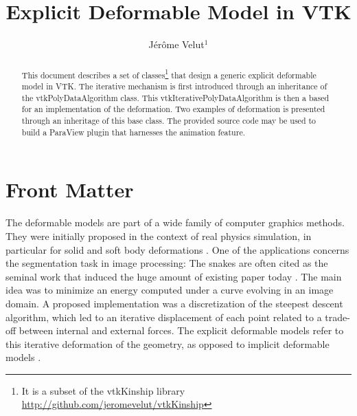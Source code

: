 \documentclass{InsightArticle}
\title{Explicit Deformable Model in VTK}
\author{J\'er\^ome Velut$^{1}$}
\newcommand{\IJhandlerIDnumber}{Xxxx}
\begin{document}
%
% 
\IJhandlefooter{\IJhandlerIDnumber}


\ifpdf
\else
\fi


\maketitle


\ifhtml
\chapter*{Front Matter\label{front}}
\fi


\begin{abstract}
\noindent
This document describes a set of classes\footnote{It is a subset of the
vtkKinship library \url{http://github.com/jeromevelut/vtkKinship}} that 
design a generic explicit deformable model in VTK. The iterative mechanism
is first introduced through an inheritance of the vtkPolyDataAlgorithm class. 
This vtkIterativePolyDataAlgorithm is then a based for an implementation of the
deformation. Two examples of deformation is presented through an inheritage of
this base class. The provided source code may be used to build a ParaView plugin
that harnesses the animation feature.
\end{abstract}

\IJhandlenote{\IJhandlerIDnumber}

\tableofcontents

The deformable models are part of a wide family of computer graphics methods.
They were initially proposed in the context of real physics simulation, 
in particular for solid and soft body deformations \cite{TER87,TER88.3}. One of the
applications concerns the segmentation task in image processing:
The snakes \cite{KAS87} are often cited as the seminal work that induced the
huge amount of existing paper today \cite{MON01}. The main idea was to minimize
an energy computed under a curve evolving in an image domain. A proposed 
implementation was a discretization of the steepest descent algorithm, which
led to an iterative displacement of each point related to a trade-off between
internal and external forces. The explicit deformable models refer to this 
iterative deformation of the geometry, as opposed to implicit deformable
models \cite{}.
\end{document}

